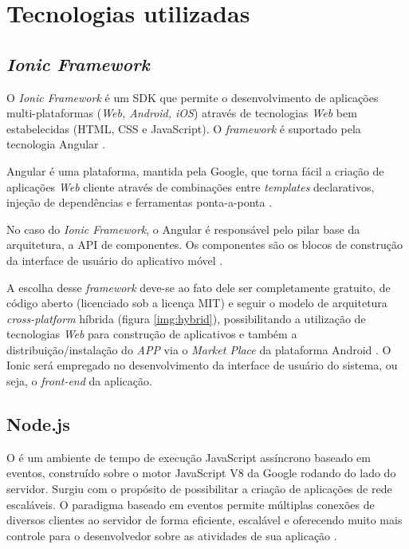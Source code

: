 \section{Tecnologias  utilizadas}

\subsection{\textit{Ionic Framework}} \label{subsec:Ionic}

O \textit{Ionic Framework} é um SDK que permite o desenvolvimento de aplicações multi-plataformas (\textit{Web, Android, iOS}) através de tecnologias \textit{Web} bem estabelecidas (HTML, CSS e JavaScript). O \textit{framework} é suportado pela tecnologia Angular \cite{SITEIONIC}.

Angular é uma plataforma, mantida pela Google, que torna fácil a criação de aplicações \textit{Web} cliente através de combinações entre \textit{templates} declarativos, injeção de dependências e ferramentas ponta-a-ponta \cite{SITEANGULAR}.

No caso do \textit{Ionic Framework}, o Angular é responsável pelo pilar base da arquitetura, a API de componentes. Os componentes são os blocos de construção da interface de usuário do aplicativo móvel \cite{SITEIONIC}.

A escolha desse \textit{framework} deve-se ao fato dele ser completamente gratuito, de código aberto (licenciado sob a licença MIT) e seguir o modelo de arquitetura \textit{cross-platform} híbrida (figura \ref{img:hybrid}), possibilitando a utilização de tecnologias \textit{Web} para construção de aplicativos e também a distribuição/instalação do \textit{APP} via o \textit{Market Place} da plataforma Android \cite{SITEIONIC}. O Ionic será empregado no desenvolvimento da interface de usuário do sistema, ou seja, o \textit{front-end} da aplicação.


\newpage

\subsection{Node.js} \label{subsec:NodeJs}

O  é um ambiente de tempo de execução JavaScript assíncrono baseado em eventos, construído sobre o motor JavaScript V8 da Google rodando do lado do servidor. Surgiu com o propósito de possibilitar a criação de aplicações de rede escaláveis. O paradigma baseado em eventos permite múltiplas conexões de diversos clientes ao servidor de forma eficiente, escalável e oferecendo muito mais controle para o desenvolvedor sobre as atividades de sua aplicação \cite{tilkov2010node}.
    
